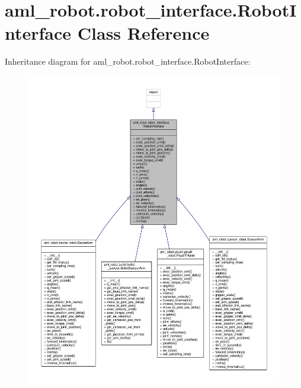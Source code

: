 \hypertarget{classaml__robot_1_1robot__interface_1_1_robot_interface}{\section{aml\-\_\-robot.\-robot\-\_\-interface.\-Robot\-Interface Class Reference}
\label{classaml__robot_1_1robot__interface_1_1_robot_interface}
}


Inheritance diagram for aml\-\_\-robot.\-robot\-\_\-interface.\-Robot\-Interface\-:
\nopagebreak
\begin{figure}[H]
\begin{center}
\leavevmode
\includegraphics[width=350pt]{classaml__robot_1_1robot__interface_1_1_robot_interface__inherit__graph}
\end{center}
\end{figure}


